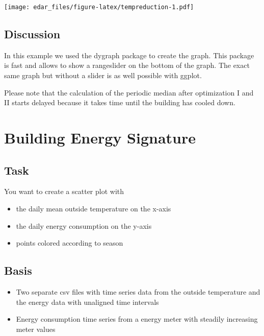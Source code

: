 \documentclass[
]{book}
\begin{document}
\texttt{[image: edar\_files/figure-latex/tempreduction-1.pdf]}

\hypertarget{discussion-9}{%
\subsection{Discussion}\label{discussion-9}}

In this example we used the dygraph package to create the graph. This package is fast and allows to show a rangeslider on the bottom of the graph. The exact same graph but without a slider is as well possible with ggplot.

Please note that the calculation of the periodic median after optimization I and II starts delayed because it takes time until the building has cooled down.

\hypertarget{building-energy-signature}{%
\section{Building Energy Signature}\label{building-energy-signature}}

\hypertarget{task-5}{%
\subsection{Task}\label{task-5}}

You want to create a scatter plot with

\begin{itemize}
\item
  the daily mean outside temperature on the x-axis
\item
  the daily energy consumption on the y-axis
\item
  points colored according to season
\end{itemize}

\hypertarget{basis-6}{%
\subsection{Basis}\label{basis-6}}

\begin{itemize}
\item
  Two separate csv files with time series data from the outside temperature and the energy data with unaligned time intervals
\item
  Energy consumption time series from a energy meter with steadily increasing meter values
\end{itemize}
\end{document}
